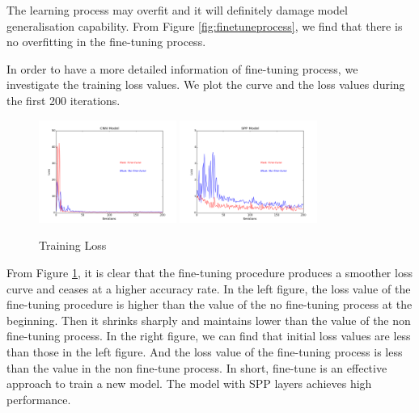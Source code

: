 The learning process may overfit and it will definitely damage model generalisation capability. From Figure \ref{fig:finetuneprocess}, we find that there is no overfitting in the fine-tuning process.

In order to have a more detailed information of fine-tuning process, we investigate the training loss values. We plot the curve and the loss values during the first 200 iterations.

\begin{figure}[!htb]
    \centering
	\includegraphics[width=0.4\textwidth]{finetuneCNNProcess.png}
	\includegraphics[width=0.4\textwidth]{finetuneSPPProcess.png}
    \caption{Training Loss}%
    \label{fig:FTvsSC}%
\end{figure}

From Figure \ref{fig:FTvsSC}, it is clear that the fine-tuning procedure produces a smoother loss curve and ceases at a higher accuracy rate. In the left figure, the loss value of the fine-tuning procedure is higher than the value of the no fine-tuning process at the beginning. Then it shrinks sharply and maintains lower than the value of the non fine-tuning process. In the right figure, we can find that initial loss values are less than those in the left figure. And the loss value of the fine-tuning process is less than the value in the non fine-tune process. In short, fine-tune is an effective approach to train a new model. The model with SPP layers achieves high performance.

